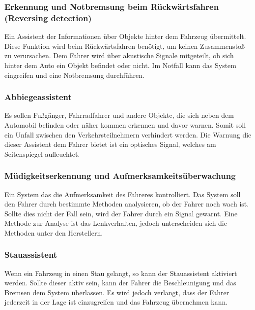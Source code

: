         \subsubsection{Erkennung und Notbremsung beim Rückwärtsfahren \newline (Reversing detection)}
        Ein Assistent der Informationen über Objekte hinter dem Fahrzeug übermittelt. Diese Funktion
        wird beim Rückwärtsfahren benötigt, um keinen Zusammenstoß zu verursachen. Dem Fahrer wird 
        über akustische Signale mitgeteilt, ob sich hinter dem Auto ein Objekt befindet oder nicht.
        Im Notfall kann das System eingreifen und eine Notbremsung durchführen.
        ~\cite{assistenzsysteme.PB2}  ~\cite{reversedetection.PB1}

        \subsubsection{Abbiegeassistent}
        Es sollen Fußgänger, Fahrradfahrer und andere Objekte, die sich neben dem Automobil befinden
        oder näher kommen erkennen und davor warnen. Somit soll ein Unfall zwischen den Verkehrsteilnehmern
        verhindert werden. Die Warnung die dieser Assistent dem Fahrer bietet ist ein optisches Signal,
        welches am Seitenspiegel aufleuchtet.
        ~\cite{assistenzsysteme.PB2} ~\cite{abbiegeassi.PB1} ~\cite{abbiegeassi.PB2}

        \subsubsection{Müdigkeitserkennung und Aufmerksamkeitsüberwachung}

        Ein System das die Aufmerksamkeit des Fahreres kontrolliert. Das System soll den Fahrer durch
        bestimmte Methoden analysieren, ob der Fahrer noch wach ist. Sollte dies nicht der Fall sein,
        wird der Fahrer durch ein Signal gewarnt. Eine Methode zur Analyse ist das Lenkverhalten, jedoch
        unterscheiden sich die Methoden unter den Herstellern.
        ~\cite{muedigkeitsassi.PB1} ~\cite{assistenzsysteme.PB1}  ~\cite{assistenzsysteme.PB2}
        ~\cite{muedigkeitsassi.PB2}
        
        \subsubsection{Stauassistent}
        Wenn ein Fahrzeug in einen Stau gelangt, so kann der Stauassistent aktiviert werden. Sollte dieser
        aktiv sein, kann der Fahrer die Beschleunigung und das Bremsen dem System überlassen. Es wird
        jedoch verlangt, dass der Fahrer jederzeit in der Lage ist einzugreifen und das Fahrzeug übernehmen
        kann.
        ~\cite{stauassi.PB1} ~\cite{stauassi.PB2}
        
